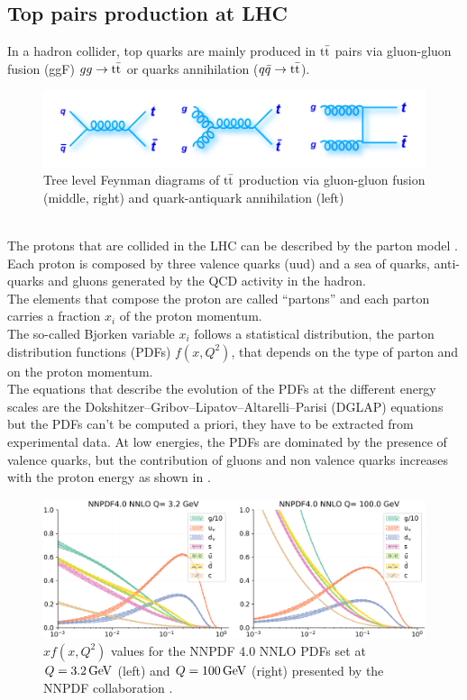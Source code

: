 \subsection{Top pairs production at LHC}
In a hadron collider, top quarks are mainly produced in ${{\text{t}}{\bar{\text{t}}}}$ pairs via gluon-gluon fusion (ggF) $gg \to {\ensuremath{{\text{t}}{\bar{\text{t}}}}}$ or quarks annihilation (${q}\bar{{q}} \to {\ensuremath{{\text{t}}{\bar{\text{t}}}}}$).
\begin{figure}[h!]
    \centering
    \includegraphics[width=0.8\linewidth]{fig//chap02-theory/ttbar.png}
    \caption{Tree level Feynman diagrams of ${{\text{t}}{\bar{\text{t}}}}$ production via gluon-gluon fusion (middle, right) and quark-antiquark annihilation (left)}
    \label{fig:tt_prod}
\end{figure}\\
The protons that are collided in the LHC can be described by the parton model \cite{Feynman1969TheEnergies}.\\
Each proton is composed by three valence quarks (uud) and a sea of quarks, anti-quarks and gluons generated by the QCD activity in the hadron.\\ 
The elements that compose the proton are called “partons” and each parton carries a fraction $x_i$ of the proton momentum.\\
The so-called Bjorken variable $x_i$ follows a statistical distribution, the parton distribution functions (PDFs) $f(x,Q^2)$, that depends on the type of parton and on the proton momentum.\\
The equations that describe the evolution of the PDFs at the different energy scales are the Dokshitzer–Gribov–Lipatov–Altarelli–Parisi (DGLAP) equations \cite{Altarelli1977AsymptoticLanguage,Gribov1972DeepTheory,Dokshitzer1977CalculationChromodynamics.} but the PDFs can't be computed a priori, they have to be extracted from experimental data.
At low energies, the PDFs are dominated by the presence of valence quarks, but the contribution of gluons and non valence quarks increases with the proton energy as shown in .
\\
\begin{figure}[h!]
    \centering
    \includegraphics[width=1\linewidth]{fig//chap02-theory/pdf.png}
    \caption{$xf(x,Q^2)$ values for the NNPDF 4.0 NNLO PDFs set at $Q=3.2{\,\text{Ge\hspace{-.08em}V}}$ (left) and $Q=100 {\,\text{Ge\hspace{-.08em}V}}$ (right) presented by the NNPDF collaboration \cite{Ball2022TheAccuracy}. }
    \label{fig:pdf}
\end{figure}
